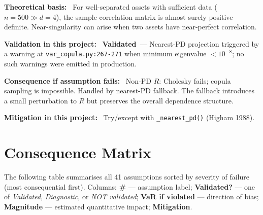 \documentclass[11pt,a4paper]{article}
\newcommand{\asmfield}[1]{\medskip\noindent\textbf{#1:}\ }
\newcommand{\code}[1]{\texttt{#1}}
\newcommand{\validated}{\textbf{Validated}}
\begin{document}
\asmfield{Theoretical basis}
For well-separated assets with sufficient data ($n = 500 \gg d = 4$), the
sample correlation matrix is almost surely positive definite. Near-singularity
can arise when two assets have near-perfect correlation.

\asmfield{Validation in this project}
\validated\ --- Nearest-PD projection triggered by a warning at
\code{var\_copula.py:267-271} when minimum eigenvalue $< 10^{-8}$; no such
warnings were emitted in production.

\asmfield{Consequence if assumption fails}
Non-PD $R$: Cholesky fails; copula sampling is impossible. Handled by
nearest-PD fallback. The fallback introduces a small perturbation to $R$
but preserves the overall dependence structure.

\asmfield{Mitigation in this project}
Try/except with \code{\_nearest\_pd()} (Higham 1988).

\section{Consequence Matrix}\label{sec:consequence-matrix}

The following table summarises all 41 assumptions sorted by severity of
failure (most consequential first). Columns: \textbf{\#} --- assumption
label; \textbf{Validated?} --- one of \emph{Validated}, \emph{Diagnostic},
or \emph{NOT validated}; \textbf{VaR if violated} --- direction of bias;
\textbf{Magnitude} --- estimated quantitative impact; \textbf{Mitigation}.
\end{document}
